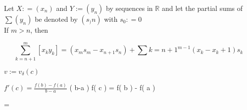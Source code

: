 \documentclass{article}
\begin{document}
Let $X: = \left( x_n \right)$ and $Y:= \left( y_n \right)$ by sequences in $\mathbb{R}$ and let the partial sums of $\sum\left( y_n \right)$ be denoted by $\left( s_)n \right)$ with $s_0 : = 0$ \\

If $m>n$, then

\begin{equation}
  \sum_{k=n+1}^{m}\left[ x_ky_k \right]=\left( x_ms_m - x_{n+1}s_n \right) + \sum{k=n+1}^{m-1}\left( x_k-x_k+1 \right)s_k
  \label{partsum}
\end{equation}


$v:=v_{\delta}\left( c \right)$

$f'\left( c \right) = \frac{f\left( b \right)-f\left( a \right)}{b-a}$
\left( b-a \right) \cdot f\left( c \right) = f\left( b \right) - f\left( a \right)


 = 
\end{document}
